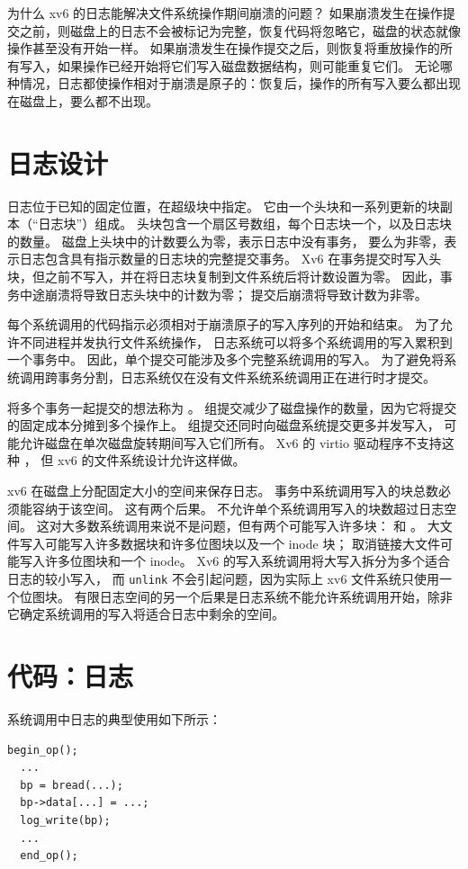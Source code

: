 为什么 xv6 的日志能解决文件系统操作期间崩溃的问题？
如果崩溃发生在操作提交之前，则磁盘上的日志不会被标记为完整，恢复代码将忽略它，磁盘的状态就像操作甚至没有开始一样。
如果崩溃发生在操作提交之后，则恢复将重放操作的所有写入，如果操作已经开始将它们写入磁盘数据结构，则可能重复它们。
无论哪种情况，日志都使操作相对于崩溃是原子的：恢复后，操作的所有写入要么都出现在磁盘上，要么都不出现。
\section{日志设计}

日志位于已知的固定位置，在超级块中指定。
它由一个头块和一系列更新的块副本（``日志块''）组成。
头块包含一个扇区号数组，每个日志块一个，以及日志块的数量。
磁盘上头块中的计数要么为零，表示日志中没有事务，
要么为非零，表示日志包含具有指示数量的日志块的完整提交事务。
Xv6 在事务提交时写入头块，但之前不写入，并在将日志块复制到文件系统后将计数设置为零。
因此，事务中途崩溃将导致日志头块中的计数为零；
提交后崩溃将导致计数为非零。

每个系统调用的代码指示必须相对于崩溃原子的写入序列的开始和结束。
为了允许不同进程并发执行文件系统操作，
日志系统可以将多个系统调用的写入累积到一个事务中。
因此，单个提交可能涉及多个完整系统调用的写入。
为了避免将系统调用跨事务分割，日志系统仅在没有文件系统系统调用正在进行时才提交。

将多个事务一起提交的想法称为
。
组提交减少了磁盘操作的数量，因为它将提交的固定成本分摊到多个操作上。
组提交还同时向磁盘系统提交更多并发写入，
可能允许磁盘在单次磁盘旋转期间写入它们所有。
Xv6 的 virtio 驱动程序不支持这种
，
但 xv6 的文件系统设计允许这样做。

xv6 在磁盘上分配固定大小的空间来保存日志。
事务中系统调用写入的块总数必须能容纳于该空间。
这有两个后果。
不允许单个系统调用写入的块数超过日志空间。
这对大多数系统调用来说不是问题，但有两个可能写入许多块：
和
。
大文件写入可能写入许多数据块和许多位图块以及一个 inode 块；
取消链接大文件可能写入许多位图块和一个 inode。
Xv6 的写入系统调用将大写入拆分为多个适合日志的较小写入，
而
\lstinline{unlink}
不会引起问题，因为实际上 xv6 文件系统只使用一个位图块。
有限日志空间的另一个后果是日志系统不能允许系统调用开始，除非它确定系统调用的写入将适合日志中剩余的空间。
\section{代码：日志}

系统调用中日志的典型使用如下所示：
\begin{lstlisting}[]
  begin_op();
  ...
  bp = bread(...);
  bp->data[...] = ...;
  log_write(bp);
  ...
  end_op();
\end{lstlisting}

